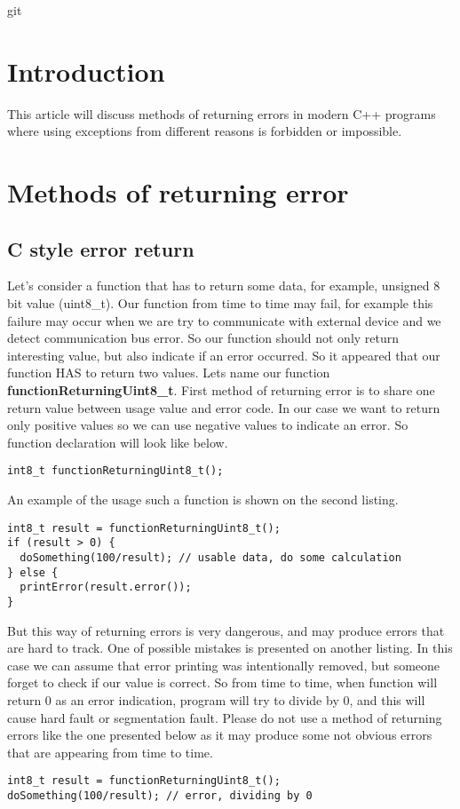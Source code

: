 git \documentclass{article}
\let\Oldsection\section
\renewcommand{\section}{\FloatBarrier\Oldsection}
\let\Oldsubsection\subsection
\renewcommand{\subsection}{\FloatBarrier\Oldsubsection}
\begin{document}
\tableofcontents
\newpage
\section{Introduction}
This article will discuss methods of returning errors in modern C++ programs where using exceptions from different reasons is forbidden or impossible.
\section{Methods of returning error}
\subsection{C style error return}
Let's consider a function that has to return some data, for example, unsigned 8 bit value (uint8\_t). Our function from time to time may fail, for example this failure may occur when we are try to communicate with external device and we detect communication bus error. So our function should not only return interesting value, but also indicate if an error occurred. So it appeared that our function HAS to return two values.\newline 
Lets name our function \textbf{functionReturningUint8\_t}. First method of returning error is to share one return value between usage value and error code. In our case we want to return only positive values so we can use negative values to indicate an error. So function declaration will look like below.

\begin{lstlisting}
int8_t functionReturningUint8_t();
\end{lstlisting}

An example of the usage such a function is shown on the second listing.

\begin{lstlisting}
int8_t result = functionReturningUint8_t();
if (result > 0) {
  doSomething(100/result); // usable data, do some calculation    
} else {
  printError(result.error()); 
}
\end{lstlisting}

But this way of returning errors is very dangerous, and may produce errors that are hard to track. One of possible mistakes is presented on another listing. In this case we can assume that error printing was intentionally removed, but someone forget to check if our value is correct. So from time to time, when function will return 0 as an error indication, program will try to divide by 0, and this will cause hard fault or segmentation fault.\newline
Please do not use a method of returning errors like the one presented below as it may produce some not obvious errors that are appearing from time to time.
\begin{lstlisting}
int8_t result = functionReturningUint8_t();
doSomething(100/result); // error, dividing by 0   
\end{lstlisting}
\end{document}

